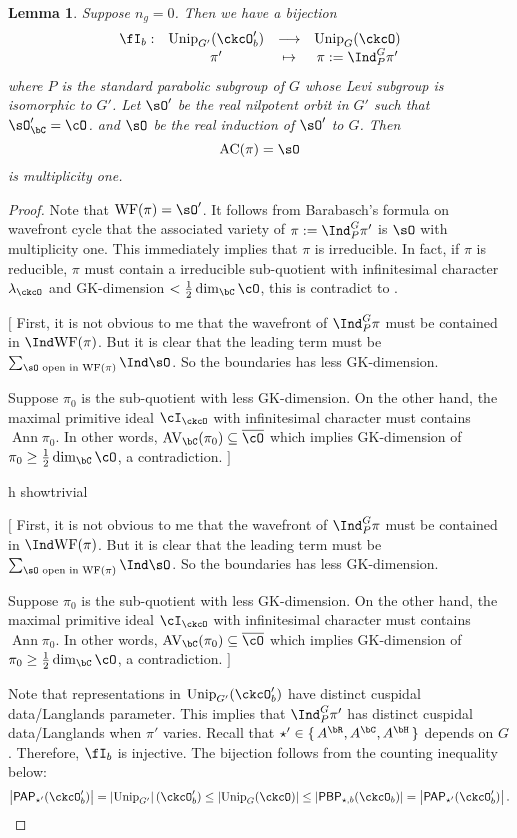 \documentclass[12pt,a4paper]{amsart}
\newcommand{\trivial}[2][]{\if\relax\detokenize{#1}\relax
  {%
      \color{orange} \vspace{0em} $[$  #2 $]$
      \color{black}
  }
  \else
\ifx#1h
\ifcsname showtrivial\endcsname
{%
    \color{orange} \vspace{0em}  $[$ #2 $]$
    \color{black}
}
\fi
\else {\red Wrong argument!} \fi
\fi
}
\newcommand{\AC}{\mathrm{AC}}
\newcommand{\WF}{\mathrm{WF}}
\newcommand{\AV}{\mathrm{AV}}
\def\abs#1{\left|{#1}\right|}
\DeclareMathOperator{\Ann}{Ann}
\numberwithin{equation}{section}
\newtheorem{lem}[thm]{Lemma}
\theoremstyle{remark}
\def\half{{\tfrac{1}{2}}}
\def\Unip{\mathrm{Unip}}
\def\lamck{\lambda_\ckcO}
\def\PP{\mathsf{PAP}}
\def\PBP{\mathsf{PBP}}
\newcommand{\Grt}{\cK}
\begin{document}
\begin{lem}\label{lem:Unip.BP}
  Suppose $n_{g}=0$. Then we have a bijection
  \[
    \begin{array}{rccc}
      \fI_{b}: &\Unip_{G'}(\ckcO'_{b}) & \longrightarrow & \Unip_{G}(\ckcO) \\
      &\pi' & \mapsto & \pi:=\Ind_{P}^{G}\pi'
    \end{array}
  \]
  where $P$ is the standard parabolic subgroup of $G$ whose Levi subgroup is
  isomorphic to $G'$.
  Let $\sO'$ be the real nilpotent orbit in $G'$ such that $\sO'_{\bC}=\cO$.
  and $\sO$ be the real induction of $\sO'$ to $G$.
  Then
  \[
    \AC(\pi) = \sO
  \]
  is multiplicity one.
\end{lem}
\begin{proof}
  Note that $\WF(\pi)=\sO'$.
  It follows from Barabasch's formula on wavefront cycle that the
  associated variety of $\pi:=\Ind_{P}^{G}\pi'$ is $\sO$ with multiplicity one.
  This immediately implies that $\pi$ is irreducible. In fact, if $\pi$ is
  reducible, $\pi$ must contain a irreducible sub-quotient with infinitesimal
  character $\lambda_{\ckcO}$ and GK-dimension $<\half\dim_{\bC}\cO$, this
  is contradict to .
  \trivial[]{
    First, it is not obvious to me that the wavefront of $\Ind_{P}^{G}\pi$
    must be contained in $\Ind\WF(\pi)$. But it is clear that the leading term
    must be $\sum_{\sO\text{ open in } \WF(\pi)}\Ind\sO$. So the boundaries has
    less GK-dimension.

    Suppose $\pi_{0}$ is the sub-quotient with less GK-dimension.
    On the other hand, the maximal primitive ideal $\cI_{\ckcO}$  with infinitesimal
    character must contains $\Ann\pi_{0}$. In other words,
    $\AV_{\bC}(\pi_{0})\subseteq \bcO$ which implies GK-dimension of
    $\pi_{0}\geq \half\dim_{\bC}\cO$, a contradiction.
  }
  Note that representations in $\Unip_{G'}(\ckcO'_{b})$ have distinct
  cuspidal data/Langlands parameter. This implies that $\Ind_{P}^{G}\pi'$ has distinct cuspidal data/Langlands when $\pi'$ varies.
  Recall that $\star' \in \set{A^{\bR},A^{\bC}, A^{\bH}}$ depends on $G$.
  Therefore, $\fI_{b}$ is injective. The bijection follows from the counting
  inequality below:
  \[
    \abs{\PP_{\star'}(\ckcO'_{b})}=\abs{\Unip_{G'}}(\ckcO'_{b})\leq \abs{\Unip_{G}(\ckcO)}
    \leq \abs{\PBP_{\star,b}(\ckcO_{b})} = \abs{\PP_{\star'}(\ckcO'_{b})}.
  \]
\end{proof}
\end{document}
